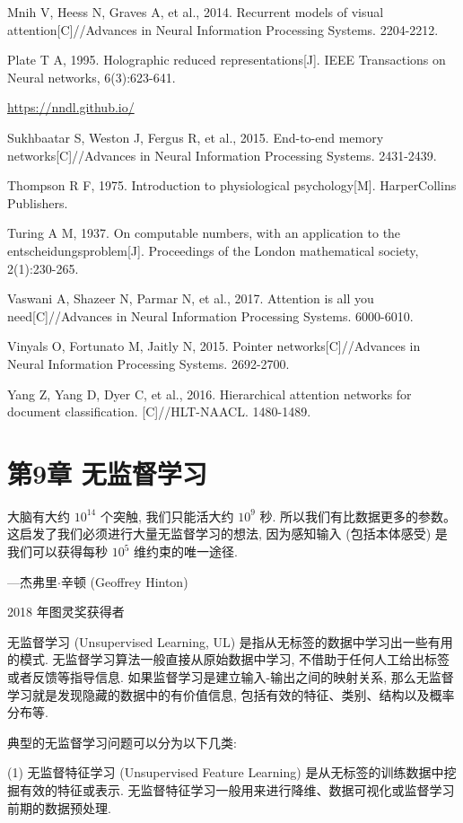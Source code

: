 \documentclass[10pt]{article}
\begin{document}
Mnih V, Heess N, Graves A, et al., 2014. Recurrent models of visual attention[C]//Advances in Neural Information Processing Systems. 2204-2212.

Plate T A, 1995. Holographic reduced representations[J]. IEEE Transactions on Neural networks, 6(3):623-641.

\href{https://nndl.github.io/}{https://nndl.github.io/}

Sukhbaatar S, Weston J, Fergus R, et al., 2015. End-to-end memory networks[C]//Advances in Neural Information Processing Systems. 2431-2439.

Thompson R F, 1975. Introduction to physiological psychology[M]. HarperCollins Publishers.

Turing A M, 1937. On computable numbers, with an application to the entscheidungsproblem[J]. Proceedings of the London mathematical society, 2(1):230-265.

Vaswani A, Shazeer N, Parmar N, et al., 2017. Attention is all you need[C]//Advances in Neural Information Processing Systems. 6000-6010.

Vinyals O, Fortunato M, Jaitly N, 2015. Pointer networks[C]//Advances in Neural Information Processing Systems. 2692-2700.

Yang Z, Yang D, Dyer C, et al., 2016. Hierarchical attention networks for document classification. [C]//HLT-NAACL. 1480-1489.

\section*{第9章 无监督学习}
大脑有大约 $10^{14}$ 个突触, 我们只能活大约 $10^{9}$ 秒. 所以我们有比数据更多的参数。这启发了我们必须进行大量无监督学习的想法, 因为感知输入 (包括本体感受) 是我们可以获得每秒 $10^{5}$ 维约束的唯一途径.

—杰弗里$\cdot$辛顿 (Geoffrey Hinton)

2018 年图灵奖获得者

无监督学习 (Unsupervised Learning, UL) 是指从无标签的数据中学习出一些有用的模式. 无监督学习算法一般直接从原始数据中学习, 不借助于任何人工给出标签或者反馈等指导信息. 如果监督学习是建立输入-输出之间的映射关系, 那么无监督学习就是发现隐藏的数据中的有价值信息, 包括有效的特征、类别、结构以及概率分布等.

典型的无监督学习问题可以分为以下几类:

(1) 无监督特征学习 (Unsupervised Feature Learning) 是从无标签的训练数据中挖掘有效的特征或表示. 无监督特征学习一般用来进行降维、数据可视化或监督学习前期的数据预处理.
\end{document}
